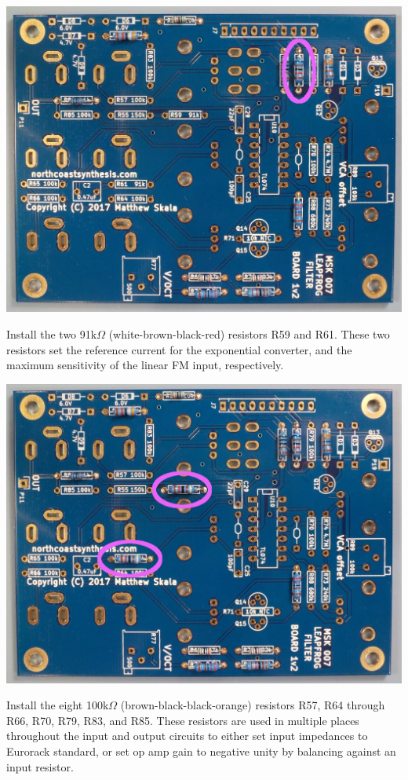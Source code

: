\nopagebreak
\noindent\includegraphics[width=\linewidth]{res-68k1.jpg}

\pagebreak

Install the two 91k$\Omega$ (white-brown-black-red) resistors R59 and R61. 
These two resistors set the reference current for the exponential converter,
and the maximum sensitivity of the linear FM input, respectively.

\nopagebreak
\noindent\includegraphics[width=\linewidth]{res-91k1.jpg}

Install the eight 100k$\Omega$ (brown-black-black-orange) resistors R57, R64
through R66, R70, R79, R83, and R85.
These resistors are used in multiple places throughout the input and output
circuits to either set input impedances to Eurorack standard, or set op amp
gain to negative unity by balancing against an input resistor.

